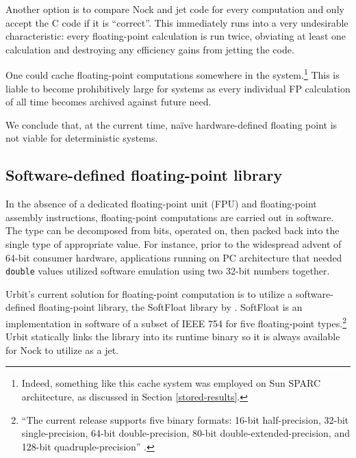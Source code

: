 \documentclass[twoside]{article}
\begin{document}
Another option is to compare Nock and jet code for every computation and only accept the C code if it is “correct”.  This immediately runs into a very undesirable characteristic:  every floating-point calculation is run twice, obviating at least one calculation and destroying any efficiency gains from jetting the code.

One could cache floating-point computations somewhere in the system.\footnote{Indeed, something like this cache system was employed on Sun SPARC architecture, as discussed in Section \ref{stored-results}.}  This is liable to become prohibitively large for systems as every individual FP calculation of all time becomes archived against future need.

We conclude that, at the current time, naïve hardware-defined floating point is not viable for deterministic systems.

\subsection{Software-defined floating-point library}

In the absence of a dedicated floating-point unit (FPU) and floating-point assembly instructions, floating-point computations are carried out in software.  The type can be decomposed from bits, operated on, then packed back into the single type of appropriate value.  For instance, prior to the widespread advent of 64-bit consumer hardware, applications running on PC architecture that needed \texttt{double} values utilized software emulation using two 32-bit numbers together.

Urbit's current solution for floating-point computation is to utilize a software-defined floating-point library, the SoftFloat library by \citeauthor{Hauser2018}.  SoftFloat is an implementation in software of a subset of IEEE 754 for five floating-point types.\footnote{“The current release supports five binary formats: 16-bit half-precision, 32-bit single-precision, 64-bit double-precision, 80-bit double-extended-precision, and 128-bit quadruple-precision” \citep{Hauser2018}.}  Urbit statically links the library into its runtime binary so it is always available for Nock to utilize as a jet.
\end{document}
